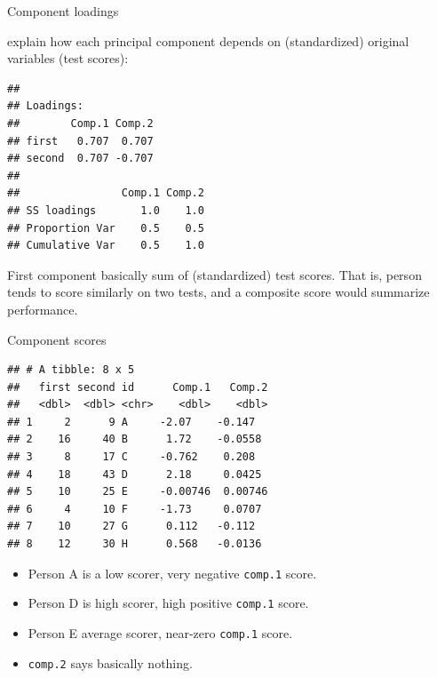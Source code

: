 \documentclass[
  ignorenonframetext,
]{beamer}
\newenvironment{Shaded}{\begin{snugshade}}{\end{snugshade}}
\newcommand{\KeywordTok}[1]{\textcolor[rgb]{0.13,0.29,0.53}{\textbf{#1}}}
\newcommand{\NormalTok}[1]{#1}
\newcommand{\OperatorTok}[1]{\textcolor[rgb]{0.81,0.36,0.00}{\textbf{#1}}}
\newcommand{\StringTok}[1]{\textcolor[rgb]{0.31,0.60,0.02}{#1}}
\begin{document}
\begin{frame}[fragile]{Component loadings}
\protect\hypertarget{component-loadings}{}

explain how each principal component depends on (standardized) original
variables (test scores):

\footnotesize

\begin{Shaded}
\end{Shaded}

\begin{verbatim}
## 
## Loadings:
##        Comp.1 Comp.2
## first   0.707  0.707
## second  0.707 -0.707
## 
##                Comp.1 Comp.2
## SS loadings       1.0    1.0
## Proportion Var    0.5    0.5
## Cumulative Var    0.5    1.0
\end{verbatim}

\normalsize

First component basically sum of (standardized) test scores. That is,
person tends to score similarly on two tests, and a composite score
would summarize performance.

\end{frame}

\begin{frame}[fragile]{Component scores}
\protect\hypertarget{component-scores}{}

\small

\begin{Shaded}
\end{Shaded}

\begin{verbatim}
## # A tibble: 8 x 5
##   first second id      Comp.1   Comp.2
##   <dbl>  <dbl> <chr>    <dbl>    <dbl>
## 1     2      9 A     -2.07    -0.147  
## 2    16     40 B      1.72    -0.0558 
## 3     8     17 C     -0.762    0.208  
## 4    18     43 D      2.18     0.0425 
## 5    10     25 E     -0.00746  0.00746
## 6     4     10 F     -1.73     0.0707 
## 7    10     27 G      0.112   -0.112  
## 8    12     30 H      0.568   -0.0136
\end{verbatim}

\normalsize

\begin{itemize}
\item
  Person A is a low scorer, very negative \texttt{comp.1} score.
\item
  Person D is high scorer, high positive \texttt{comp.1} score.
\item
  Person E average scorer, near-zero \texttt{comp.1} score.
\item
  \texttt{comp.2} says basically nothing.
\end{itemize}

\end{frame}
\end{document}
